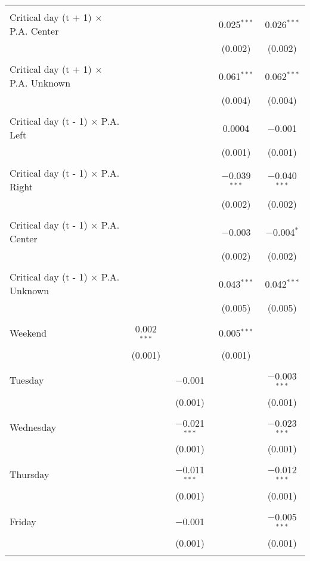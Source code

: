\documentclass[
]{article}
\begin{document}
\begin{table}[!htbp]
{\begin{tabular}{@{\extracolsep{5pt}}lcccc}
  & & & & \\ 
 Critical day (t + 1) $\times$ P.A. Center &  &  & 0.025$^{***}$ & 0.026$^{***}$ \\ 
  &  &  & (0.002) & (0.002) \\ 
  & & & & \\ 
 Critical day (t + 1) $\times$ P.A. Unknown &  &  & 0.061$^{***}$ & 0.062$^{***}$ \\ 
  &  &  & (0.004) & (0.004) \\ 
  & & & & \\ 
 Critical day (t - 1) $\times$ P.A. Left &  &  & 0.0004 & $-$0.001 \\ 
  &  &  & (0.001) & (0.001) \\ 
  & & & & \\ 
 Critical day (t - 1) $\times$ P.A. Right &  &  & $-$0.039$^{***}$ & $-$0.040$^{***}$ \\ 
  &  &  & (0.002) & (0.002) \\ 
  & & & & \\ 
 Critical day (t - 1) $\times$ P.A. Center &  &  & $-$0.003 & $-$0.004$^{*}$ \\ 
  &  &  & (0.002) & (0.002) \\ 
  & & & & \\ 
 Critical day (t - 1) $\times$ P.A. Unknown &  &  & 0.043$^{***}$ & 0.042$^{***}$ \\ 
  &  &  & (0.005) & (0.005) \\ 
  & & & & \\ 
 Weekend & 0.002$^{***}$ &  & 0.005$^{***}$ &  \\ 
  & (0.001) &  & (0.001) &  \\ 
  & & & & \\ 
 Tuesday &  & $-$0.001 &  & $-$0.003$^{***}$ \\ 
  &  & (0.001) &  & (0.001) \\ 
  & & & & \\ 
 Wednesday &  & $-$0.021$^{***}$ &  & $-$0.023$^{***}$ \\ 
  &  & (0.001) &  & (0.001) \\ 
  & & & & \\ 
 Thursday &  & $-$0.011$^{***}$ &  & $-$0.012$^{***}$ \\ 
  &  & (0.001) &  & (0.001) \\ 
  & & & & \\ 
 Friday &  & $-$0.001 &  & $-$0.005$^{***}$ \\ 
  &  & (0.001) &  & (0.001) \\ 
  & & & & \\ 

\end{tabular}}
\end{table}
\end{document}

